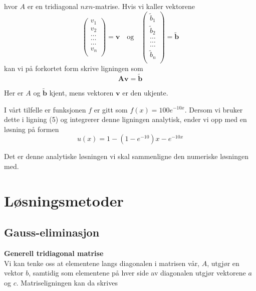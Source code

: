 \documentclass{article}
\begin{document}
hvor $A$ er en tridiagonal $nxn$-matrise. Hvis vi kaller vektorene
\begin{equation}
\left(\begin{array}{c}
                           v_1\\
                           v_2\\
                           \dots \\
                          \dots  \\
                          \dots \\
                           v_n\\
                      \end{array} \right) = \textbf{v} \quad \textrm{og} \quad 
                      \left(\begin{array}{c}
                           \tilde{b}_1\\
                           \tilde{b}_2\\
                           \dots \\
                           \dots \\
                          \dots \\
                           \tilde{b}_n\\
                      \end{array} \right) =\tilde{\textbf{b}}
\end{equation}
kan vi på forkortet form skrive ligningen som
\begin{equation}
\textbf{Av} = \tilde{\textbf{b}}
\end{equation}

Her er $A$ og $\tilde{\textbf{b}}$ kjent, mens vektoren $\textbf{v}$ er den ukjente.

I vårt tilfelle er funksjonen $f$ er gitt som $f(x) = 100e^{-10x}$. Dersom vi bruker dette i ligning (5) og integrerer denne ligningen analytisk, ender vi opp med en løsning på formen
\begin{equation}
u(x) = 1- (1-e^{-10})x-e^{-10x}
\end{equation}

Det er denne analytiske løsningen vi skal sammenligne den numeriske løsningen med. 

\section{Løsningsmetoder}
\subsection{Gauss-eliminasjon}
\textbf{Generell tridiagonal matrise}\\
Vi kan tenke oss at elementene langs diagonalen i matrisen vår, $A$, utgjør en vektor $b$, samtidig som elementene på hver side av diagonalen utgjør vektorene $a$ og $c$. Matriseligningen kan da skrives
\end{document}
